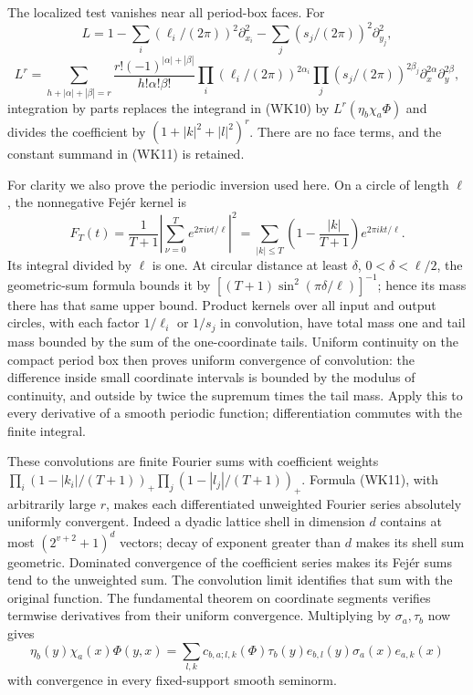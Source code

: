 \documentclass[
  11pt,
]{article}
\begin{document}
The localized test vanishes near all period-box faces. For \[
 L=1-\sum_i(\ell_i/(2\pi))^2\partial_{x_i}^2
       -\sum_j(s_j/(2\pi))^2\partial_{y_j}^2,
\] \[
 L^r=\sum_{h+|\alpha|+|\beta|=r}
 \frac{r!(-1)^{|\alpha|+|\beta|}}{h!\alpha!\beta!}
 \prod_i(\ell_i/(2\pi))^{2\alpha_i}
 \prod_j(s_j/(2\pi))^{2\beta_j}
                 \partial_x^{2\alpha}\partial_y^{2\beta},
 \tag{WK11}
\] integration by parts replaces the integrand in (WK10) by
\(L^r(\eta_b\chi_a\Phi)\) and divides the coefficient by
\((1+|k|^2+|l|^2)^r\). There are no face terms, and the constant summand
in (WK11) is retained.

For clarity we also prove the periodic inversion used here. On a circle
of length \(\ell\), the nonnegative Fejér kernel is \[
 F_T(t)=\frac1{T+1}\left|\sum_{\nu=0}^T e^{2\pi i\nu t/\ell}\right|^2
 =\sum_{|k|\leq T}\left(1-\frac{|k|}{T+1}\right)e^{2\pi ikt/\ell}.
 \tag{WK12}
\] Its integral divided by \(\ell\) is one. At circular distance at
least \(\delta\), \(0<\delta<\ell/2\), the geometric-sum formula bounds
it by \([(T+1)\sin^2(\pi\delta/\ell)]^{-1}\); hence its mass there has
that same upper bound. Product kernels over all input and output
circles, with each factor \(1/\ell_i\) or \(1/s_j\) in convolution, have
total mass one and tail mass bounded by the sum of the one-coordinate
tails. Uniform continuity on the compact period box then proves uniform
convergence of convolution: the difference inside small coordinate
intervals is bounded by the modulus of continuity, and outside by twice
the supremum times the tail mass. Apply this to every derivative of a
smooth periodic function; differentiation commutes with the finite
integral.

These convolutions are finite Fourier sums with coefficient weights
\(\prod_i(1-|k_i|/(T+1))_+\prod_j(1-|l_j|/(T+1))_+\). Formula (WK11),
with arbitrarily large \(r\), makes each differentiated unweighted
Fourier series absolutely uniformly convergent. Indeed a dyadic lattice
shell in dimension \(d\) contains at most \((2^{v+2}+1)^d\) vectors;
decay of exponent greater than \(d\) makes its shell sum geometric.
Dominated convergence of the coefficient series makes its Fejér sums
tend to the unweighted sum. The convolution limit identifies that sum
with the original function. The fundamental theorem on coordinate
segments verifies termwise derivatives from their uniform convergence.
Multiplying by \(\sigma_a,\tau_b\) now gives \[
 \eta_b(y)\chi_a(x)\Phi(y,x)=
    \sum_{l,k}c_{b,a;l,k}(\Phi)
            \tau_b(y)e_{b,l}(y)\sigma_a(x)e_{a,k}(x)
 \tag{WK13}
\] with convergence in every fixed-support smooth seminorm.
\end{document}
